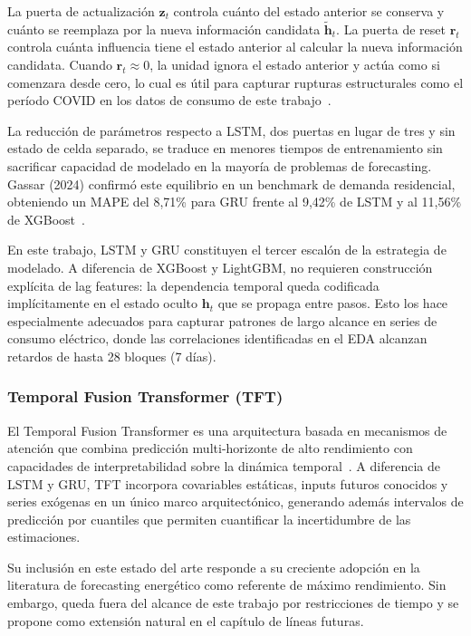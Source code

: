 \documentclass[12pt, a4paper]{article}
\begin{document}
La puerta de actualización $\mathbf{z}_t$ controla cuánto del estado anterior se conserva y cuánto se reemplaza por la nueva información candidata $\tilde{\mathbf{h}}_t$. La puerta de reset $\mathbf{r}_t$ controla cuánta influencia tiene el estado anterior al calcular la nueva información candidata. Cuando $\mathbf{r}_t \approx 0$, la unidad ignora el estado anterior y actúa como si comenzara desde cero, lo cual es útil para capturar rupturas estructurales como el período COVID en los datos de consumo de este trabajo~\cite{cho2014}.

La reducción de parámetros respecto a LSTM, dos puertas en lugar de tres y sin estado de celda separado, se traduce en menores tiempos de entrenamiento sin sacrificar capacidad de modelado en la mayoría de problemas de forecasting. Gassar (2024) confirmó este equilibrio en un benchmark de demanda residencial, obteniendo un MAPE del 8,71\% para GRU frente al 9,42\% de LSTM y al 11,56\% de XGBoost~\cite{gassar2024}.

En este trabajo, LSTM y GRU constituyen el tercer escalón de la estrategia de modelado. A diferencia de XGBoost y LightGBM, no requieren construcción explícita de lag features: la dependencia temporal queda codificada implícitamente en el estado oculto $\mathbf{h}_t$ que se propaga entre pasos. Esto los hace especialmente adecuados para capturar patrones de largo alcance en series de consumo eléctrico, donde las correlaciones identificadas en el EDA alcanzan retardos de hasta 28 bloques (7 días).

\subsubsection{Temporal Fusion Transformer (TFT)}

El Temporal Fusion Transformer es una arquitectura basada en mecanismos de atención que combina predicción multi-horizonte de alto rendimiento con capacidades de interpretabilidad sobre la dinámica temporal~\cite{lim2021}. A diferencia de LSTM y GRU, TFT incorpora covariables estáticas, inputs futuros conocidos y series exógenas en un único marco arquitectónico, generando además intervalos de predicción por cuantiles que permiten cuantificar la incertidumbre de las estimaciones.

Su inclusión en este estado del arte responde a su creciente adopción en la literatura de forecasting energético como referente de máximo rendimiento. Sin embargo, queda fuera del alcance de este trabajo por restricciones de tiempo y se propone como extensión natural en el capítulo de líneas futuras.
\end{document}
